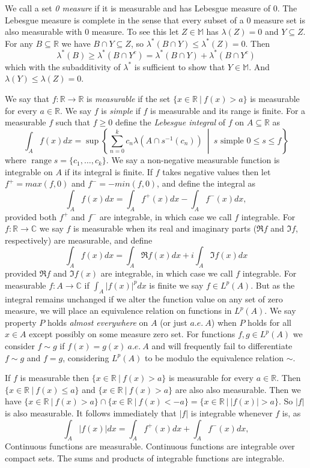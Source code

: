 \documentclass{report}
\newcommand{\R}{\mathbb{R}}
\newcommand{\C}{\mathbb{C}}
\newcommand{\M}{\mathbb{M}}
\DeclareMathOperator{\range}{range}
\begin{document}
We call a set \emph{0 measure} if it is measurable and has Lebesgue measure of 0. The Lebesgue measure is complete in the sense that every subset of a 0 measure set is also measurable with 0 measure.
To see this let $Z \in \M$ has $\lambda(Z)=0$ and $Y \subseteq Z$.
For any $B \subseteq \R$ we have $B\cap Y \subseteq Z$, so $\lambda^\ast (B\cap Y) \leq \lambda^\ast(Z)=0$. Then
$$
\lambda^\ast(B) \geq \lambda^\ast(B\cap Y^c)=\lambda^\ast(B\cap Y) + \lambda^\ast (B \cap Y^c)
$$
which with the subadditivity of $\lambda^\ast$ is sufficient to show that $Y \in \M$. And $\lambda(Y) \leq \lambda(Z) =0$.

We say that $f:\R \to \R$ is \emph{measurable} if the set $\{x \in \R \ | \ f(x) > a\}$ is measurable for every $a\in \R$. We say $f$ is \emph{simple} if $f$ is measurable and its range is finite.  For a measurable $f$ such that $f \geq 0$ define the \emph{Lebesgue integral} of $f$ on $A\subseteq \R$ as
$$\int_A f(x) dx= \sup \left \{ \sum_{n=0}^k c_n \lambda(A\cap s^{-1}(c_n)) \ \middle | \ s \mbox{ simple } 0\leq s \leq f \right \}$$
where $\range s=\{c_1,\ldots, c_k\}$. We say a non-negative measurable function is integrable on $A$ if its integral is finite.  If $f$ takes negative values then let $f^+=max(f,0)$ and  $f^-=-min(f,0)$, and define the integral as
$$
\int_A f(x) dx=\int_A f^+(x) dx-\int_A f^-(x) dx,
$$
provided both $f^+$ and $f^-$ are integrable, in which case we call $f$ integrable. 
For $f:\R \to \C$ we say $f$ is measurable when its real and imaginary parts ($\Re f$ and $\Im f$, respectively) are measurable, and define
$$
\int_A f(x) dx=\int_A \Re f(x) dx+i\int_A \Im f(x) dx
$$
provided $\Re f$ and $\Im f(x)$ are integrable, in which case we call $f$ integrable. For measurable $f:A \to \C$ if $\int_A |f(x)|^p dx$ is finite we say $f \in L^p (A)$.
But as the integral remains unchanged if we alter the function value on any set of zero measure, we will place an equivalence relation on functions in $L^p (A)$.
We say property $P$ holds \emph{almost everywhere} on $A$ (or just $a.e. \ A$) when $P$ holds for all $x \in A$ except possibly on some measure zero set.
For functions $f,g \in  L^p(A)$ we consider $f \sim g$ if $f(x)=g(x) \ a.e. \ A$ and will frequently fail to differentiate $f\sim g$ and $f = g$, considering $ L^p(A)$ to be modulo the equivalence relation $\sim$.

If $f$ is measurable then $\{x\in \R \ | \ f(x)>a\}$ is measurable for every $a\in \R$. Then $\{x\in \R \ | \ f(x) \leq a\}$ and $\{x\in \R \ | \ f(x) > a\}$ are also also measurable. Then we have $\{x\in \R \ | \ f(x) > a\} \cap \{x\in \R \ | \ f(x) < -a\} = \{x \in \R \ | \ |f(x)|>a\}$.
So $|f|$ is also measurable.
It follows immediately that $|f|$ is integrable whenever $f$ is, as
$$
\int_A |f(x)| dx=\int_A f^+(x) dx+\int_A f^-(x) dx,
$$
Continuous functions are measurable. Continuous functions are integrable over compact sets. The sums and products of integrable functions are integrable.
\end{document}
